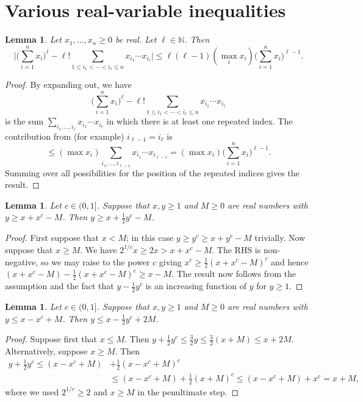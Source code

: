 \documentclass[11pt,reqno]{amsart}
\numberwithin{equation}{section}
\newtheorem{lemma}[theorem]{Lemma}
\theoremstyle{definition}
\theoremstyle{remark}
\renewcommand{\le}{\leqslant}
\renewcommand{\ge}{\geqslant}
\newcommand\N{\mathbb{N}}
\begin{document}
\section{Various real-variable inequalities}\label{appC}

\begin{lemma}\label{lemmaB1}
Let $x_1,\dots, x_n \ge 0$ be real. Let $\ell \in \N$. Then 
\[ \big| \big(\sum_{i = 1}^n x_i \big)^{\ell} - \ell! \sum_{1 \le i_1 < \cdots < i_{\ell} \le n} x_{i_1} \cdots x_{i_{\ell}} \big| \le \ell (\ell-1) (\max_i x_i) \big( \sum_{i = 1}^n x_i \big)^{\ell - 1}. \]
\end{lemma}
\begin{proof} 
By expanding out, we have
\[ \big(\sum_{i = 1}^n x_i \big)^{\ell} - \ell! \sum_{1 \le i_1 < \cdots < i_{\ell} \le n} x_{i_1} \cdots x_{i_{\ell}} \] is the sum $\sum_{i_1,\dots, i_{\ell}} x_{i_1} \cdots x_{i_{\ell}}$ in which there is at least one repeated index. The contribution from (for example) $i_{\ell-1} = i_{\ell}$ is
\[ \le (\max x_i) \sum_{i_1,\dots, i_{\ell-1}}x_{i_1} \cdots x_{i_{\ell-1}} = (\max x_i) \big( \sum_{i = 1}^n x_i\big)^{\ell - 1}. \]
Summing over all possibilities for the position of the repeated indices gives the result.\end{proof}


\begin{lemma}\label{calc-1}
Let $c \in (0,1]$. Suppose that $x, y \ge 1$ and $M \ge 0$ are real numbers with $y \ge x + x^c - M$. Then $y \ge x + \frac{1}{2} y^c - M$.
\end{lemma}
\begin{proof}  First suppose that $x < M$; in this case $y \ge y^c \ge  x + y^c - M$ trivially. Now suppose that $x \ge M$. We have $2^{1/c} x \ge 2x > x + x^c - M$. The RHS is non-negative, so we may raise to the power $c$ giving $x^c \ge \frac{1}{2}(x + x^c - M)^c$ and hence $(x + x^c - M) - \frac{1}{2}(x + x^c - M)^c \ge x - M$. The result now follows from the assumption and the fact that $y - \frac{1}{2}y^c$ is an increasing function of $y$ for $y \ge 1$.\end{proof}

\begin{lemma}\label{calc-2}
Let $c \in (0,1]$. Suppose that $x, y \ge 1$ and $M \ge 0$ are real numbers with $y \le x - x^c + M$. Then $y \le x - \frac{1}{2} y^c + 2M$.
\end{lemma}
\begin{proof}
Suppose first that $x \le M$. Then $y + \frac{1}{2} y^c \le \tfrac{3}{2}y \le \tfrac{3}{2}(x + M) \le x + 2M$. Alternatively, suppose $x \ge M$. Then 
\begin{align*}
y + \tfrac{1}{2} y^c \le (x - x^c + M) & + \tfrac{1}{2}(x - x^c + M)^c \\ & \le (x - x^c + M) + \tfrac{1}{2}(x + M)^c \le (x - x^c + M) + x^c = x + M, 
\end{align*}
where we used $2^{1/c} \ge 2$ and $x \ge M$ in the penultimate step.
\end{proof}
\end{document}
